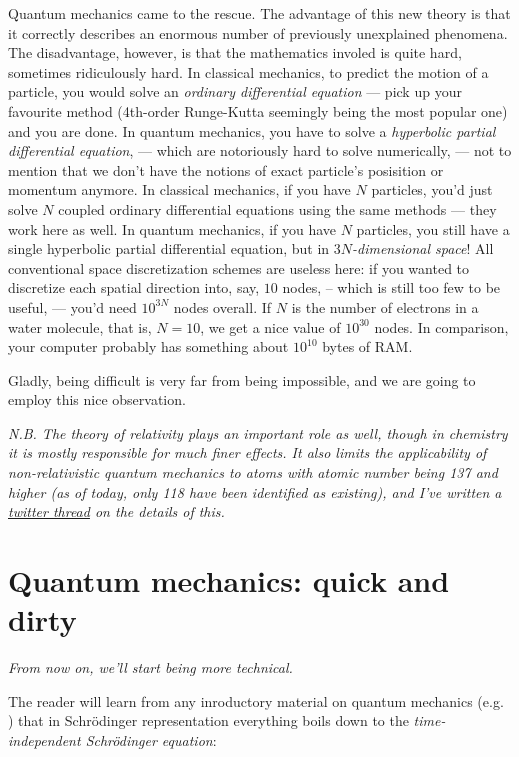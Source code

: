 \documentclass{article}
\begin{document}
Quantum mechanics came to the rescue. The advantage of this new theory is that it correctly describes an enormous number of previously unexplained phenomena. The disadvantage, however, is that the mathematics involed is quite hard, sometimes ridiculously hard. In classical mechanics, to predict the motion of a particle, you would solve an \textit{ordinary differential equation} --- pick up your favourite method (4th-order Runge-Kutta seemingly being the most popular one) and you are done. In quantum mechanics, you have to solve a \textit{hyperbolic partial differential equation}, --- which are notoriously hard to solve numerically, --- not to mention that we don't have the notions of exact particle's posisition or momentum anymore. In classical mechanics, if you have \(N\) particles, you'd just solve \(N\) coupled ordinary differential equations using the same methods --- they work here as well. In quantum mechanics, if you have \(N\) particles, you still have a single hyperbolic partial differential equation, but in \textit{\(3N\)-dimensional space}! All conventional space discretization schemes are useless here: if you wanted to discretize each spatial direction into, say, \(10\) nodes, -- which is still too few to be useful, --- you'd need \(10^{3N}\) nodes overall. If \(N\) is the number of electrons in a water molecule, that is, \(N=10\), we get a nice value of \(10^{30}\) nodes. In comparison, your computer probably has something about \(10^{10}\) bytes of RAM.

Gladly, being difficult is very far from being impossible, and we are going to employ this nice observation.

\textit{N.B. The theory of relativity plays an important role as well, though in chemistry it is mostly responsible for much finer effects. It also limits the applicability of non-relativistic quantum mechanics to atoms with atomic number being 137 and higher (as of today, only 118 have been identified as existing), and I've written a \href{https://twitter.com/lisyarus/status/1189227697605660673?s=20}{twitter thread} on the details of this.}

\newpage

\section{Quantum mechanics: quick and dirty} \label{sec:qm}

\textit{From now on, we'll start being more technical.}

The reader will learn from any inroductory material on quantum mechanics (e.g. \cite{ref:atkins}) that in Schrödinger representation everything boils down to the \textit{time-independent Schrödinger equation}:
\end{document}
